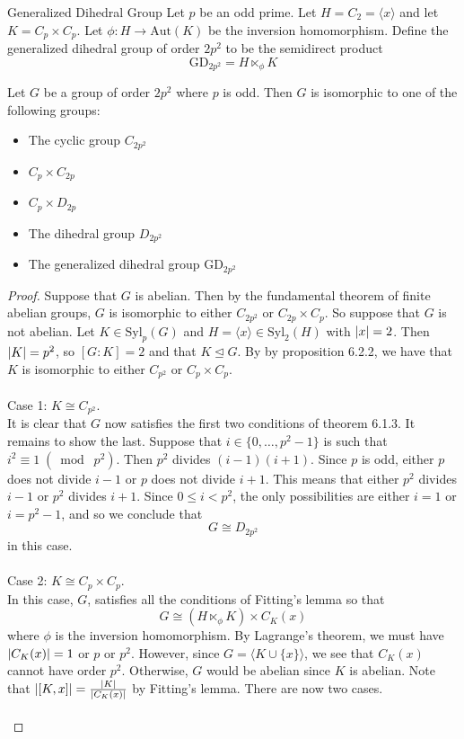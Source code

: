 \documentclass[a4paper]{article}
\begin{document}
\begin{defn}{Generalized Dihedral Group}{} Let $p$ be an odd prime. Let $H=C_2=\langle x\rangle$ and let $K=C_p\times C_p$. Let $\phi:H\to\text{Aut}(K)$ be the inversion homomorphism. Define the generalized dihedral group of order $2p^2$ to be the semidirect product $$\text{GD}_{2p^2}=H\ltimes_\phi K$$
\end{defn}

\begin{prp}{}{} Let $G$ be a group of order $2p^2$ where $p$ is odd. Then $G$ is isomorphic to one of the following groups: 
\begin{itemize}
\item The cyclic group $C_{2p^2}$
\item $C_p\times C_{2p}$
\item $C_p\times D_{2p}$
\item The dihedral group $D_{2p^2}$
\item The generalized dihedral group $\text{GD}_{2p^2}$
\end{itemize} \tcbline
\begin{proof}
Suppose that $G$ is abelian. Then by the fundamental theorem of finite abelian groups, $G$ is isomorphic to either $C_{2p^2}$ or $C_{2p}\times C_p$. So suppose that $G$ is not abelian. Let $K\in\text{Syl}_p(G)$ and $H=\langle x\rangle\in\text{Syl}_2(H)$ with $\abs{x}=2$. Then $\abs{K}=p^2$, so $[G:K]=2$ and that $K\trianglelefteq G$. By by proposition 6.2.2, we have that $K$ is isomorphic to either $C_{p^2}$ or $C_p\times C_p$. \\~\\

Case 1: $K\cong C_{p^2}$. \\
It is clear that $G$ now satisfies the first two conditions of theorem 6.1.3. It remains to show the last. Suppose that $i\in\{0,\dots,p^2-1\}$ is such that $i^2\equiv 1\;(\bmod\;p^2)$. Then $p^2$ divides $(i-1)(i+1)$. Since $p$ is odd, either $p$ does not divide $i-1$ or $p$ does not divide $i+1$. This means that either $p^2$ divides $i-1$ or $p^2$ divides $i+1$. Since $0\leq i<p^2$, the only possibilities are either $i=1$ or $i=p^2-1$, and so we conclude that $$G\cong D_{2p^2}$$ in this case. \\~\\

Case 2: $K\cong C_p\times C_p$. \\
In this case, $G$, satisfies all the conditions of Fitting's lemma so that $$G\cong(H\ltimes_\phi K)\times C_K(x)$$ where $\phi$ is the inversion homomorphism. By Lagrange's theorem, we must have $\abs{C_K(x)}=1$ or $p$ or $p^2$. However, since $G=\langle K\cup\{x\}\rangle$, we see that $C_K(x)$ cannot have order $p^2$. Otherwise, $G$ would be abelian since $K$ is abelian.  Note that $\abs{[K,x]}=\frac{\abs{K}}{\abs{C_K(x)}}$ by Fitting's lemma. There are now two cases. \\~\\


\end{proof}
\end{prp}
\end{document}
